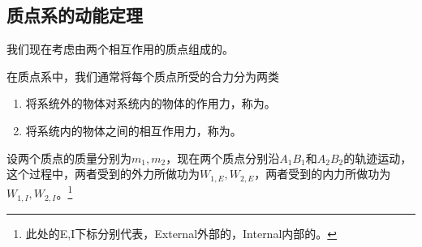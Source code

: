 \subsection{质点系的动能定理}
我们现在考虑由两个相互作用的质点组成的。

在质点系中，我们通常将每个质点所受的合力分为两类
\begin{enumerate}
    \item 将系统外的物体对系统内的物体的作用力，称为。
    \item 将系统内的物体之间的相互作用力，称为。
\end{enumerate}
设两个质点的质量分别为$m_1,m_2$，现在两个质点分别沿$A_1B_1$和$A_2B_2$的轨迹运动，这个过程中，两者受到的外力所做功为$W_{1,E},W_{2,E}$，两者受到的内力所做功为$W_{1,I},W_{2,I}$。\footnote{此处的E,I下标分别代表，External外部的，Internal内部的。}

